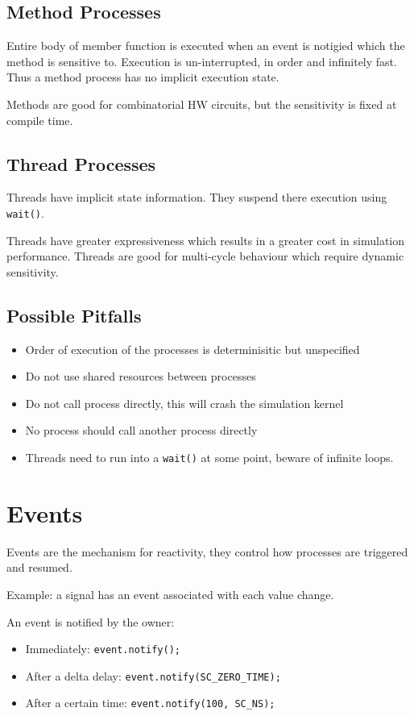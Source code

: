 \subsection{Method Processes}
Entire body of member function is executed when an event is notigied
which the method is sensitive to. Execution is un-interrupted, in order and infinitely fast. Thus a method process has no implicit execution state.

Methods are good for combinatorial HW circuits, but the sensitivity is fixed at compile time.

\subsection{Thread Processes}
Threads have implicit state information. 
They suspend there execution using \lstinline{wait()}.

Threads have greater expressiveness which results in a greater cost in simulation performance. Threads are good for multi-cycle behaviour which require dynamic sensitivity.

\subsection{Possible Pitfalls}
\begin{itemize}
    \item Order of execution of the processes is determinisitic but unspecified
    \item Do not use shared resources between processes
    \item Do not call process directly, this will crash the simulation kernel
    \item No process should call another process directly
    \item Threads need to run into a \lstinline{wait()} at some point, beware of infinite loops.
\end{itemize}

\section{Events}
Events are the mechanism for reactivity, they control how processes are triggered and resumed.

Example: a signal has an event associated with each value change.

An event is notified by the owner:
\begin{itemize}
    \item Immediately: \lstinline{event.notify();}
    \item After a delta delay: \lstinline{event.notify(SC_ZERO_TIME);}
    \item After a certain time: \lstinline{event.notify(100, SC_NS);}
\end{itemize}

